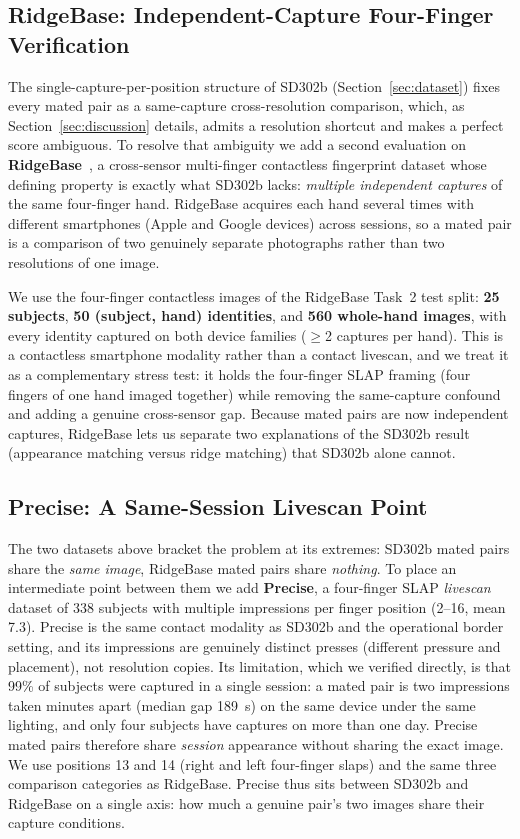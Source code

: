 \documentclass[journal]{IEEEtran}
\begin{document}
\subsection{RidgeBase: Independent-Capture Four-Finger Verification}
\label{sec:ridgebase}

The single-capture-per-position structure of SD302b (Section~\ref{sec:dataset})
fixes every mated pair as a same-capture cross-resolution comparison, which,
as Section~\ref{sec:discussion} details, admits a resolution shortcut and makes
a perfect score ambiguous. To resolve that ambiguity we add a second
evaluation on \textbf{RidgeBase}~\cite{ridgebase2022}, a cross-sensor
multi-finger contactless fingerprint dataset whose defining property is exactly
what SD302b lacks: \emph{multiple independent captures} of the same four-finger
hand. RidgeBase acquires each hand several times with different smartphones
(Apple and Google devices) across sessions, so a mated pair is a comparison of
two genuinely separate photographs rather than two resolutions of one image.

We use the four-finger contactless images of the RidgeBase Task~2 test split:
\textbf{25 subjects}, \textbf{50 (subject, hand) identities}, and \textbf{560
whole-hand images}, with every identity captured on both device families
($\geq$2 captures per hand). This is a contactless smartphone modality rather
than a contact livescan, and we treat it as a complementary stress test: it
holds the four-finger SLAP framing (four fingers of one hand imaged together)
while removing the same-capture confound and adding a genuine cross-sensor gap.
Because mated pairs are now independent captures, RidgeBase lets us separate two
explanations of the SD302b result (appearance matching versus ridge
matching) that SD302b alone cannot.

\subsection{Precise: A Same-Session Livescan Point}
\label{sec:precise}

The two datasets above bracket the problem at its extremes: SD302b mated pairs
share the \emph{same image}, RidgeBase mated pairs share \emph{nothing}. To
place an intermediate point between them we add \textbf{Precise}, a four-finger
SLAP \emph{livescan} dataset of 338 subjects with multiple impressions per
finger position (2--16, mean 7.3). Precise is the same contact modality as
SD302b and the operational border setting, and its impressions are genuinely
distinct presses (different pressure and placement), not resolution copies. Its
limitation, which we verified directly, is that 99\% of subjects were captured
in a single session: a mated pair is two impressions taken minutes apart (median
gap 189~s) on the same device under the same lighting, and only four subjects
have captures on more than one day. Precise mated pairs therefore share
\emph{session} appearance without sharing the exact image. We use positions 13
and 14 (right and left four-finger slaps) and the same three comparison
categories as RidgeBase. Precise thus sits between SD302b and RidgeBase on a
single axis: how much a genuine pair's two images share their capture
conditions.
\end{document}

